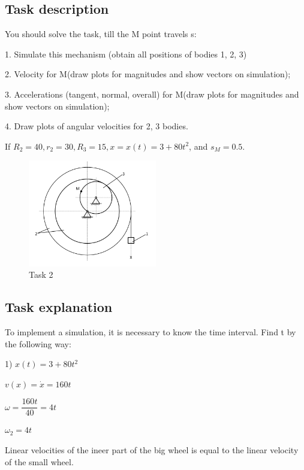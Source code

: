 \documentclass{article}
\begin{document}
\subsection{Task description}

You should solve the task, till the M point travels s:

1. Simulate this mechanism (obtain all positions of
bodies 1, 2, 3)

2. Velocity for M(draw plots for magnitudes and
show vectors on simulation);

3. Accelerations (tangent, normal, overall) for
M(draw plots for magnitudes and show vectors
on simulation);

4. Draw plots of angular velocities for 2, 3 bodies.


If \( R_2 = 40, r_2 = 30, R_3 = 15, x = x(t) = 3 + 80t^2 \), and \( s_M = 0.5 \).

\begin{figure}[H]
    \centering
    \includegraphics[width=0.5\textwidth]{Task2.png}
    \caption{Task 2\label{Task 2}}
\end{figure}

\subsection{Task explanation}

To implement a simulation, it is necessary to know the time interval. Find t by the following way:

1) \(x(t) = 3 + 80t^2 \)

\( v(x) = \dot x = 160t\)

$\omega = \dfrac{160t}{40} = 4t$

$\omega_2 = 4t$

Linear velocities of the ineer part of the big wheel is equal to the linear velocity of the  small 
wheel.
\end{document}

